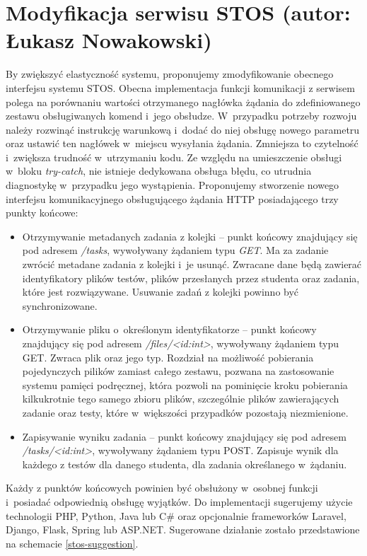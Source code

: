\section{Modyfikacja serwisu STOS (autor: Łukasz Nowakowski)}
By zwiększyć elastyczność systemu, proponujemy zmodyfikowanie obecnego interfejsu systemu STOS. Obecna implementacja funkcji komunikacji z serwisem polega na porównaniu wartości otrzymanego nagłówka żądania do zdefiniowanego zestawu obsługiwanych komend i~jego obsłudze. W~przypadku potrzeby rozwoju należy rozwinąć instrukcję warunkową i~dodać do niej obsługę nowego parametru oraz ustawić ten nagłówek w~miejscu wysyłania żądania. Zmniejsza to czytelność i~zwiększa trudność w~utrzymaniu kodu. Ze względu na umieszczenie obsługi w~bloku \textit{try-catch}, nie istnieje dedykowana obsługa błędu, co utrudnia diagnostykę w~przypadku jego wystąpienia. Proponujemy stworzenie nowego interfejsu komunikacyjnego obsługującego żądania HTTP posiadającego trzy punkty końcowe:
\begin{itemize}
    \item Otrzymywanie metadanych zadania z kolejki -- punkt końcowy znajdujący się pod adresem \textit{/tasks}, wywoływany żądaniem typu \textit{GET}. Ma za zadanie zwrócić metadane zadania z kolejki i~je usunąć. Zwracane dane będą zawierać identyfikatory plików testów, plików przesłanych przez studenta oraz zadania, które jest rozwiązywane. Usuwanie zadań z kolejki powinno być synchronizowane.
    \item Otrzymywanie pliku o~określonym identyfikatorze -- punkt końcowy znajdujący się pod adresem \textit{/files/<id:int>}, wywoływany żądaniem typu GET. Zwraca plik oraz jego typ. Rozdział na możliwość pobierania pojedynczych pilików zamiast całego zestawu, pozwana na zastosowanie systemu pamięci podręcznej, która pozwoli na pominięcie kroku pobierania kilkukrotnie tego samego zbioru plików, szczególnie plików zawierających zadanie oraz testy, które w~większości przypadków pozostają niezmienione.
    \item Zapisywanie wyniku zadania -- punkt końcowy znajdujący się pod adresem \textit{/tasks/<id:int>}, wywoływany żądaniem typu POST. Zapisuje wynik dla każdego z testów dla danego studenta, dla zadania określanego w~żądaniu.
\end{itemize}
\newline \indent Każdy z punktów końcowych powinien być obsłużony w~osobnej funkcji i~posiadać odpowiednią obsługę wyjątków. Do implementacji sugerujemy użycie technologii PHP, Python, Java lub C# oraz opcjonalnie frameworków Laravel, Django, Flask, Spring lub ASP.NET. Sugerowane działanie zostało przedstawione na schemacie \ref{stos-suggestion}.
